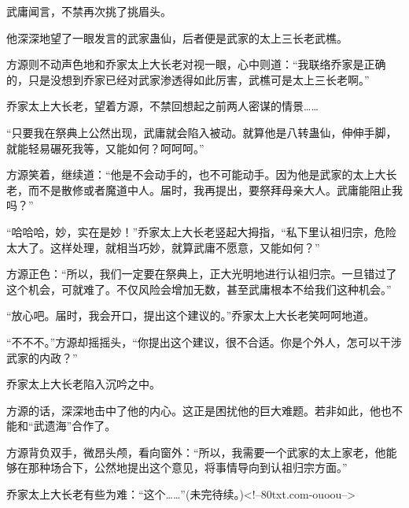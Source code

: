 \begin{this_body}
武庸闻言，不禁再次挑了挑眉头。

他深深地望了一眼发言的武家蛊仙，后者便是武家的太上三长老武樵。

方源则不动声色地和乔家太上大长老对视一眼，心中则道：“我联络乔家是正确的，只是没想到乔家已经对武家渗透得如此厉害，武樵可是太上三长老啊。”

乔家太上大长老，望着方源，不禁回想起之前两人密谋的情景……

“只要我在祭典上公然出现，武庸就会陷入被动。就算他是八转蛊仙，伸伸手脚，就能轻易碾死我等，又能如何？呵呵呵。”

方源笑着，继续道：“他是不会动手的，也不可能动手。因为他是武家的太上大长老，而不是散修或者魔道中人。届时，我再提出，要祭拜母亲大人。武庸能阻止我吗？”

“哈哈哈，妙，实在是妙！”乔家太上大长老竖起大拇指，“私下里认祖归宗，危险太大了。这样处理，就相当巧妙，就算武庸不愿意，又能如何？”

方源正色：“所以，我们一定要在祭典上，正大光明地进行认祖归宗。一旦错过了这个机会，可就难了。不仅风险会增加无数，甚至武庸根本不给我们这种机会。”

“放心吧。届时，我会开口，提出这个建议的。”乔家太上大长老笑呵呵地道。

“不不不。”方源却摇摇头，“你提出这个建议，很不合适。你是个外人，怎可以干涉武家的内政？”

乔家太上大长老陷入沉吟之中。

方源的话，深深地击中了他的内心。这正是困扰他的巨大难题。若非如此，他也不能和“武遗海”合作了。

方源背负双手，微昂头颅，看向窗外：“所以，我需要一个武家的太上家老，他能够在那种场合下，公然地提出这个意见，将事情导向到认祖归宗方面。”

乔家太上大长老有些为难：“这个……”(未完待续。)<!--80txt.com-ouoou-->

\end{this_body}

